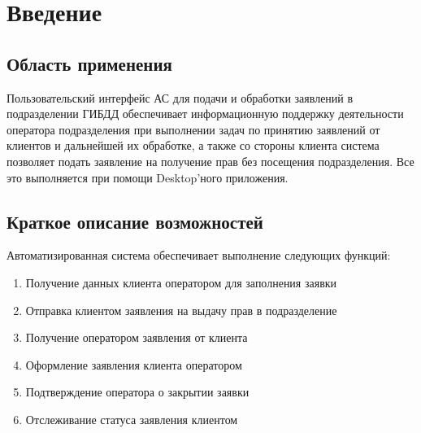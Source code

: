\documentclass[russian, utf8, 12pt,pointsubsection,floatsubsection]{eskdtext}
\begin{document}
	\maketitle 

	\scriptsize
	\setcounter{tocdepth}{4}
	\tableofcontents
	\normalsize
	\newpage
	


\section{Введение}

\subsection{Область применения}
Пользовательский интерфейс АС для подачи и обработки заявлений в подразделении ГИБДД обеспечивает информационную поддержку деятельности оператора подразделения при выполнении задач по принятию заявлений от клиентов и дальнейшей их обработке, а также со стороны клиента система позволяет подать заявление на получение прав без посещения подразделения. Все это выполняется при помощи Desktop'ного приложения.

\subsection{Краткое описание возможностей}
Автоматизированная система обеспечивает выполнение следующих функций:
\begin{enumerate}
        \item Получение данных клиента оператором для заполнения заявки
        \item Отправка клиентом заявления на выдачу прав в подразделение

        \item Получение оператором заявления от клиента
        \item Оформление заявления клиента оператором
        \item Подтверждение оператора о закрытии заявки 

        \item Отслеживание статуса заявления клиентом

\end{enumerate}
\end{document}
